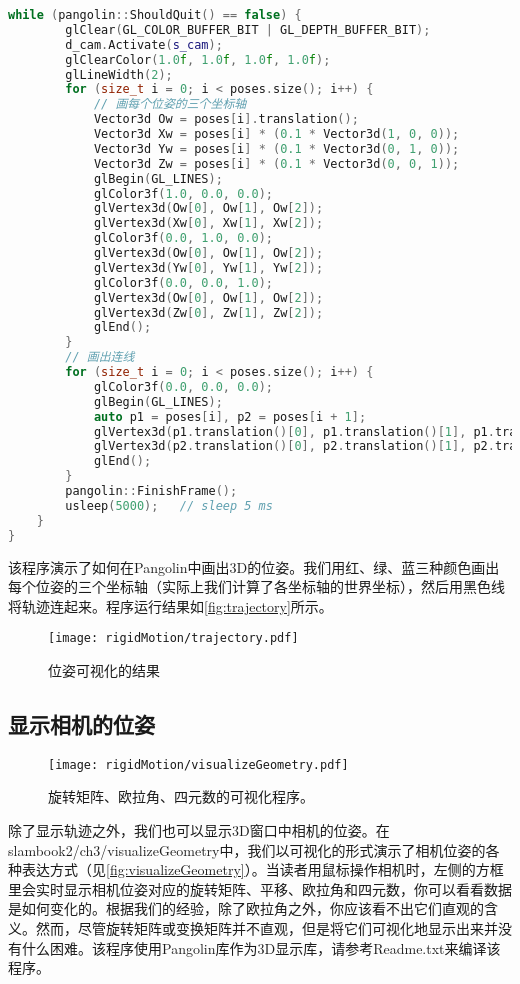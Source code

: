 \begin{lstlisting}[language=c++,caption=slambook2/ch3/examples/plotTrajectory.cpp]
    while (pangolin::ShouldQuit() == false) {
        glClear(GL_COLOR_BUFFER_BIT | GL_DEPTH_BUFFER_BIT);
        d_cam.Activate(s_cam);
        glClearColor(1.0f, 1.0f, 1.0f, 1.0f);
        glLineWidth(2);
        for (size_t i = 0; i < poses.size(); i++) {
            // 画每个位姿的三个坐标轴
            Vector3d Ow = poses[i].translation();
            Vector3d Xw = poses[i] * (0.1 * Vector3d(1, 0, 0));
            Vector3d Yw = poses[i] * (0.1 * Vector3d(0, 1, 0));
            Vector3d Zw = poses[i] * (0.1 * Vector3d(0, 0, 1));
            glBegin(GL_LINES);
            glColor3f(1.0, 0.0, 0.0);
            glVertex3d(Ow[0], Ow[1], Ow[2]);
            glVertex3d(Xw[0], Xw[1], Xw[2]);
            glColor3f(0.0, 1.0, 0.0);
            glVertex3d(Ow[0], Ow[1], Ow[2]);
            glVertex3d(Yw[0], Yw[1], Yw[2]);
            glColor3f(0.0, 0.0, 1.0);
            glVertex3d(Ow[0], Ow[1], Ow[2]);
            glVertex3d(Zw[0], Zw[1], Zw[2]);
            glEnd();
        }
        // 画出连线
        for (size_t i = 0; i < poses.size(); i++) {
            glColor3f(0.0, 0.0, 0.0);
            glBegin(GL_LINES);
            auto p1 = poses[i], p2 = poses[i + 1];
            glVertex3d(p1.translation()[0], p1.translation()[1], p1.translation()[2]);
            glVertex3d(p2.translation()[0], p2.translation()[1], p2.translation()[2]);
            glEnd();
        }
        pangolin::FinishFrame();
        usleep(5000);   // sleep 5 ms
    }
}
\end{lstlisting}

该程序演示了如何在Pangolin中画出3D的位姿。我们用红、绿、蓝三种颜色画出每个位姿的三个坐标轴（实际上我们计算了各坐标轴的世界坐标），然后用黑色线将轨迹连起来。程序运行结果如\autoref{fig:trajectory}所示。

\begin{figure}[!htp]
    \centering
    \texttt{[image: rigidMotion/trajectory.pdf]}
    \caption{位姿可视化的结果}
    \label{fig:trajectory}
\end{figure}

\subsection{显示相机的位姿}
\begin{figure}[!htp]
    \centering
    \texttt{[image: rigidMotion/visualizeGeometry.pdf]}
    \caption{旋转矩阵、欧拉角、四元数的可视化程序。}
    \label{fig:visualizeGeometry}
\end{figure}
除了显示轨迹之外，我们也可以显示3D窗口中相机的位姿。在slambook2/ch3/visualizeGeometry中，我们以可视化的形式演示了相机位姿的各种表达方式（见\autoref{fig:visualizeGeometry}）。当读者用鼠标操作相机时，左侧的方框里会实时显示相机位姿对应的旋转矩阵、平移、欧拉角和四元数，你可以看看数据是如何变化的。根据我们的经验，除了欧拉角之外，你应该看不出它们直观的含义。然而，尽管旋转矩阵或变换矩阵并不直观，但是将它们可视化地显示出来并没有什么困难。该程序使用Pangolin库作为3D显示库，请参考Readme.txt来编译该程序。

